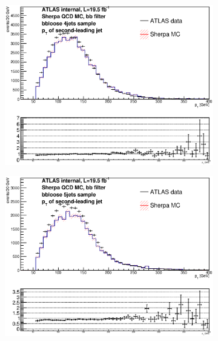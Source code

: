 \begin{figure}[phtb!]
\begin{center}
  \begin{subfigure}[$bbloose$ 4 jet category]{0.3\textwidth}\includegraphics[width=\textwidth]{MonteCarlo/figures/pt1_bbloose_4jets.eps}\end{subfigure}
  \begin{subfigure}[$bbloose$ 5+ jet category]{0.3\textwidth}\includegraphics[width=\textwidth]{MonteCarlo/figures/pt1_bbloose_5jets.eps}\end{subfigure}

\end{center}
\end{figure}
